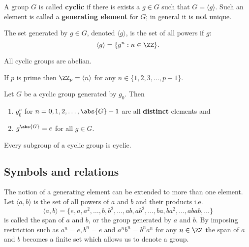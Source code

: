 \documentclass[12pt, a4paper]{article}
\begin{document}
\begin{definition}
    A group \(G\) is called \textbf{cyclic} if there is exists a \(g \in G\) such that \(G =\langle g \rangle\). Such an element is called a \textbf{generating element} for \(G\); in general it is \textbf{not} unique.
\end{definition}

\begin{theorem}
    The set generated by \(g \in G\), denoted \(\langle g \rangle\), is the set of all powers if \(g\):
    \[\langle g \rangle =\{g^n : n \in \ZZ\}.\]
\end{theorem}

\begin{mdnote}
All cyclic groups are abelian.
\end{mdnote}

\begin{theorem}
    If \(p\) is prime then \(\ZZ_p= \langle n \rangle\) for any \(n\in\{1,2,3,\ldots, p-1\}\).
\end{theorem}

\begin{theorem}
    Let \(G\) be a cyclic group generated by \(g_0\). Then
    \begin{enumerate}
        \item \(g_0^n\) for \(n=0,1,2,\ldots, \abs{G}-1\) are all \textbf{distinct} elements and
        \item \(g^{\abs{G}} = e\) for all \(g\in G\).
    \end{enumerate}
\end{theorem}

\begin{theorem}
    Every subgroup of a cyclic group is cyclic.
\end{theorem}

\subsection{Symbols and relations}

The notion of a generating element can be extended to more than one element. Let \(\langle a,b \rangle\)  is the set of all powers of \(a\) and \(b\) and their products i.e. \[\langle a,b \rangle =\{e,a,a^2,\ldots,b,b^2,\ldots,ab,ab^2,\ldots,ba,ba^2,\ldots,abab, \ldots\}\] is called the span of \(a\) and \(b\), or the group generated by \(a\) and \(b\). By imposing restriction such as \(a^n =e, b^n =e\) and \(a^nb^n=b^na^n\) for any \(n\in \ZZ\) the span of \(a\) and \(b\) becomes a finite set which allows us to denote a group.
\end{document}
